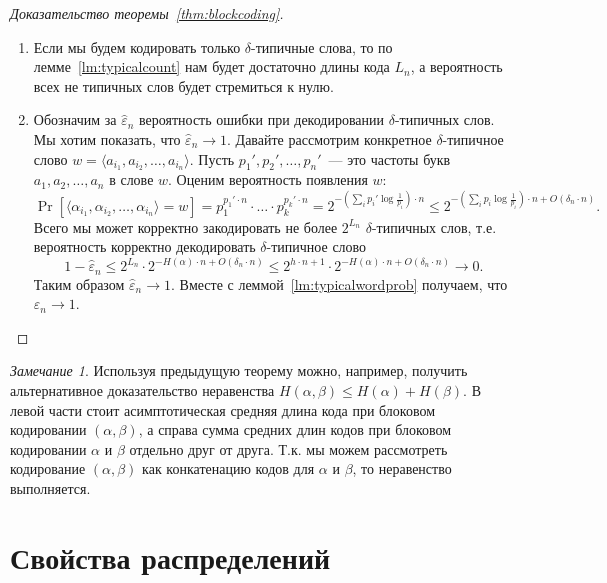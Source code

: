 \documentclass[12pt]{article}
\newcommand{\seqn}[2]{{#1}_1,{#1}_2,\dotsc,{#1}_{#2}}
\newcommand{\seqin}[3]{{#1}_{{#2}_1},{#1}_{{#2}_2},\dotsc,{#1}_{{#2}_{#3}}}
\theoremstyle{definition}
\theoremstyle{plain}
\theoremstyle{remark}
\newtheorem{remark}{Замечание}[section]
\begin{document}
\begin{proof}[Доказательство теоремы~\ref{thm:blockcoding}] \mbox{}
    \begin{enumerate} 
    \item Если мы будем кодировать только $\delta$-типич\-ные слова, то по
    лемме~\ref{lm:typicalcount} нам будет достаточно длины кода $L_n$, а
    вероятность всех не типичных слов будет стремиться к нулю.

    \item Обозначим за $\hat\varepsilon_n$ вероятность ошибки при декодировании
         $\delta$-типичных слов.
        Мы хотим показать, что $\hat\varepsilon_n\to1$.  
        Давайте рассмотрим конкретное $\delta$-типичное слово
        $w=\langle\seqin{a}{i}{n}\rangle$. Пусть $p_1', p_2',\dotsc,p_n'$~---
        это частоты букв $\seqn{a}{n}$ в слове $w$.
        Оценим вероятность появления $w$:
        \[
            \Pr[\langle\seqin{\alpha}{i}{n}\rangle = w] = 
            p_1^{p_1'\cdot n} \cdot \dotsc \cdot p_k^{p_k'\cdot n} 
            =   2^{-(\sum_i p_i'\log\frac{1}{p_i})\cdot n}
            \le 2^{-(\sum_i p_i\log\frac{1}{p_i})\cdot n + O(\delta_n\cdot n)}.
        \]
        Всего мы может корректно закодировать не более $2^{L_n}$
        $\delta$-типичных слов, т.е. вероятность корректно декодировать
        $\delta$-типичное слово
        \[
            1 - \hat\varepsilon_n \le 2^{L_n}\cdot 2^{-H(\alpha)\cdot n + O(\delta_n\cdot n)} \le
            2^{h\cdot n + 1}\cdot 2^{-H(\alpha)\cdot n + O(\delta_n\cdot n)} 
            \to 0.
        \]
        Таким образом $\hat\varepsilon_n\to1$. Вместе с
        леммой~\ref{lm:typicalwordprob} получаем, что $\varepsilon_n\to1$.

    \end{enumerate}
\end{proof}
\begin{remark}
    Используя предыдущую теорему можно, например, получить альтернативное
    доказательство неравенства $H(\alpha,\beta)\le H(\alpha) + H(\beta)$. В
    левой части стоит асимптотическая средняя длина кода при блоковом
    кодировании $(\alpha,\beta)$, а справа сумма средних длин кодов
    при блоковом кодировании $\alpha$ и $\beta$ отдельно друг от друга. Т.к. мы
    можем рассмотреть кодирование $(\alpha,\beta)$ как конкатенацию кодов для
    $\alpha$ и $\beta$, то неравенство выполняется.
\end{remark}

\section{Свойства распределений}
\end{document}
